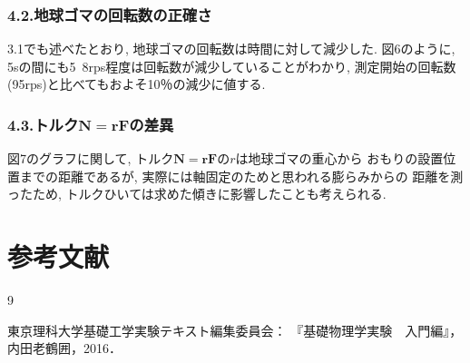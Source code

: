 \documentclass{jlreq}
\begin{document}
\subsubsection*{4.2.地球ゴマの回転数の正確さ}

3.1でも述べたとおり, 地球ゴマの回転数は時間に対して減少した. 
図6のように, 5sの間にも5~8rps程度は回転数が減少していることがわかり, 
測定開始の回転数(95rps)と比べてもおよそ10％の減少に値する. 

\subsubsection*{4.3.トルク$\bm{N} = \bm{rF}$の差異}

図7のグラフに関して, トルク$\bm{N} = \bm{rF}$の$r$は地球ゴマの重心から
おもりの設置位置までの距離であるが, 実際には軸固定のためと思われる膨らみからの
距離を測ったため, トルクひいては求めた傾きに影響したことも考えられる. 



\section*{参考文献}
\begin{thebibliography}{9}

東京理科大学基礎工学実験テキスト編集委員会：
『基礎物理学実験　入門編』，内田老鶴囲，2016．



\end{thebibliography}
\end{document}
